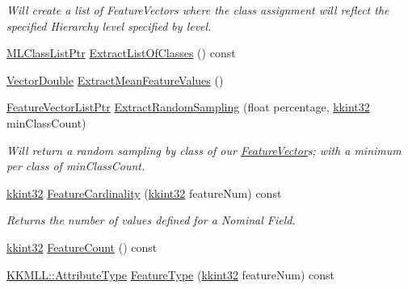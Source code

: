\begin{DoxyCompactItemize}
\begin{DoxyCompactList}\small\item\em Will create a list of Feature\+Vectors where the class assignment will reflect the specified Hierarchy level specified by \textquotesingle{}level\textquotesingle{}. \end{DoxyCompactList}\item 
\hyperlink{namespace_k_k_m_l_l_af091cde3f4a4315658b41a5e7583fc26}{M\+L\+Class\+List\+Ptr} \hyperlink{class_k_k_m_l_l_1_1_feature_vector_list_af4bffa9713e7632b9e0e33f931528164}{Extract\+List\+Of\+Classes} () const 
\item 
\hyperlink{namespace_k_k_b_a5906c207479607e5f450434095914a41}{Vector\+Double} \hyperlink{class_k_k_m_l_l_1_1_feature_vector_list_a7fb88517d42291999d993b6e9fef9881}{Extract\+Mean\+Feature\+Values} ()
\item 
\hyperlink{class_k_k_m_l_l_1_1_feature_vector_list_af22f34b214e0dd3b16760002ce392355}{Feature\+Vector\+List\+Ptr} \hyperlink{class_k_k_m_l_l_1_1_feature_vector_list_aab15a5b666887829e12f5bf21d3496fc}{Extract\+Random\+Sampling} (float percentage, \hyperlink{namespace_k_k_b_a8fa4952cc84fda1de4bec1fbdd8d5b1b}{kkint32} min\+Class\+Count)
\begin{DoxyCompactList}\small\item\em Will return a random sampling by class of our \hyperlink{class_k_k_m_l_l_1_1_feature_vector}{Feature\+Vector}\textquotesingle{}s; with a minimum per class of \textquotesingle{}min\+Class\+Count\textquotesingle{}. \end{DoxyCompactList}\item 
\hyperlink{namespace_k_k_b_a8fa4952cc84fda1de4bec1fbdd8d5b1b}{kkint32} \hyperlink{class_k_k_m_l_l_1_1_feature_vector_list_a28732bdce896c4e5c33a8bd8fa68d101}{Feature\+Cardinality} (\hyperlink{namespace_k_k_b_a8fa4952cc84fda1de4bec1fbdd8d5b1b}{kkint32} feature\+Num) const 
\begin{DoxyCompactList}\small\item\em Returns the number of values defined for a Nominal Field. \end{DoxyCompactList}\item 
\hyperlink{namespace_k_k_b_a8fa4952cc84fda1de4bec1fbdd8d5b1b}{kkint32} \hyperlink{class_k_k_m_l_l_1_1_feature_vector_list_a85039e5ef770bf276235b95318bbb2ad}{Feature\+Count} () const 
\item 
\hyperlink{namespace_k_k_m_l_l_a99973706982b59debba670e2480555ab}{K\+K\+M\+L\+L\+::\+Attribute\+Type} \hyperlink{class_k_k_m_l_l_1_1_feature_vector_list_a49dd60389037cdeb61f6c3e7b40f2a6b}{Feature\+Type} (\hyperlink{namespace_k_k_b_a8fa4952cc84fda1de4bec1fbdd8d5b1b}{kkint32} feature\+Num) const 

\end{DoxyCompactItemize}

